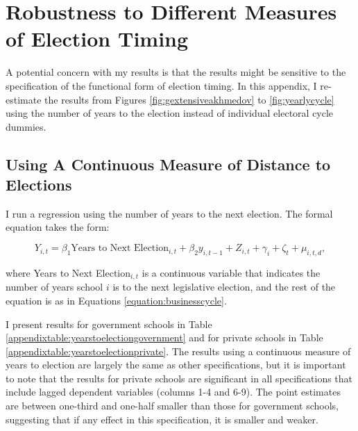 \documentclass[hidelinks, 12pt, article, oneside]{memoir}
\begin{document}
\appendix

\renewcommand*{\thepage}{A\arabic{page}}
\renewcommand\thefigure{A\arabic{figure}}
\renewcommand\thetable{A\arabic{table}}
\renewcommand\thesection{A\arabic{section}}
\renewcommand\theequation{A\arabic{equation}}
\setcounter{figure}{0}
\setcounter{table}{0}
\setcounter{equation}{0}

\tableofcontents

\clearpage

\section{Robustness to Different Measures of Election Timing}\label{appendixsection:alternativespecifications}

A potential concern with my results is that the results might be sensitive to the specification of the functional form of election timing.  In this appendix, I re-estimate the results from Figures \ref{fig:gextensiveakhmedov} to \ref{fig:yearlycycle} using the number of years to the election instead of individual electoral cycle dummies.

\subsection{Using A Continuous Measure of Distance to Elections}

I run a regression using the number of years to the next election.  The formal equation takes the form:

\begin{equation}
    Y_{i,t} = \beta_{1}\text{Years to Next Election}_{i,t} + \beta_{2}y_{i,t-1} + Z_{i,t} + \gamma_{i} + \zeta_{t} + \mu_{i,t,d},\label{equation:continuous}
\end{equation}

where Years to Next Election$_{i,t}$ is a continuous variable that indicates the number of years school $i$ is to the next legislative election, and the rest of the equation is as in Equations \ref{equation:businesscycle}.

I present results for government schools in Table \ref{appendixtable:yearstoelectiongovernment} and for private schools in Table \ref{appendixtable:yearstoelectionprivate}.  The results using a continuous measure of years to election are largely the same as other specifications, but it is important to note that the results for private schools are significant in all specifications that include lagged dependent variables (columns 1-4 and 6-9). The point estimates are between one-third and one-half smaller than those for government schools, suggesting that if any effect in this specification, it is smaller and weaker.
\end{document}
